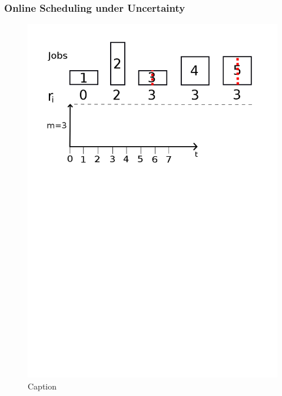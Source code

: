 \documentclass{beamer}
\begin{document}

\begin{frame}
  \frametitle{Online Scheduling under Uncertainty}
  \begin{figure}[H]
          \centering
          \includegraphics[width=\textwidth]{uncertain.png}
          \caption{Caption}
          \label{fig:online_png}
  \end{figure}

\end{frame}
\end{document}
